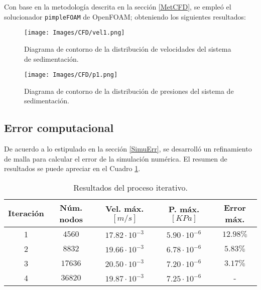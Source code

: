 \noindent
\justify

Con base en la metodolog\'ia descrita en la secci\'on \ref{MetCFD}, se emple\'o el solucionador \texttt{pimpleFOAM} de OpenFOAM; obteniendo los siguientes resultados:

\begin{figure}[h!]
	\centering
	\texttt{[image: Images/CFD/vel1.png]}
	\caption{Diagrama de contorno de la distribuci\'on de velocidades del sistema de sedimentaci\'on.}
	\label{CFD:vel}
\end{figure}

\begin{figure}[h!]
	\centering
	\texttt{[image: Images/CFD/p1.png]}
	\caption{Diagrama de contorno de la distribuci\'on de presiones del sistema de sedimentaci\'on.}
	\label{CFD:p}
\end{figure}

\subsection{Error computacional}

\noindent
\justify

De acuerdo a lo estipulado en la secci\'on \ref{SimuErr}, se desarroll\'o un refinamiento de malla para calcular el error de la simulaci\'on num\'erica. El resumen de resultados se puede apreciar en el Cuadro \ref{resumErr}.

\begin{table}[h!]
	\centering
	\begin{tabular}{|c|c|c|c|c|}
		\hline
		\textbf{Iteraci\'on} & \textbf{N\'um. nodos} & \textbf{Vel. m\'ax.$[m/s]$} & \textbf{P. m\'ax. $[KPa]$} & \textbf{Error m\'ax.} \\ \hline
		1 & $4560$ & $17.82 \cdot 10 ^{-3}$ & $5.90 \cdot 10 ^{-6}$ & $12.98 \%$ \\ \hline
		2 & $8832$ & $19.66 \cdot 10 ^{-3}$ & $6.78 \cdot 10 ^{-6}$ & $5.83 \%$ \\ \hline
		3 & $17636$ & $20.50 \cdot 10 ^{-3}$ & $ 7.20 \cdot 10 ^{-6}$ & $3.17 \%$ \\ \hline
		4 & $36820$ & $19.87 \cdot 10 ^{-3}$ & $7.25 \cdot 10 ^{-6}$ & - \\ \hline
	\end{tabular}
	\caption{Resultados del proceso iterativo.}
	\label{resumErr}
\end{table}

\noindent
\justify

